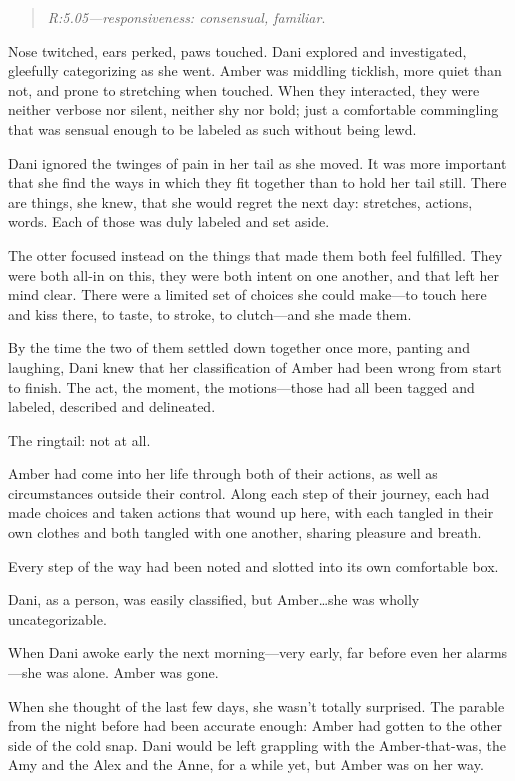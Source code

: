 \begin{quote}
\emph{R:5.05---responsiveness: consensual, familiar}.
\end{quote}

Nose twitched, ears perked, paws touched. Dani explored and investigated, gleefully categorizing as she went. Amber was middling ticklish, more quiet than not, and prone to stretching when touched. When they interacted, they were neither verbose nor silent, neither shy nor bold; just a comfortable commingling that was sensual enough to be labeled as such without being lewd.

Dani ignored the twinges of pain in her tail as she moved. It was more important that she find the ways in which they fit together than to hold her tail still. There are things, she knew, that she would regret the next day: stretches, actions, words. Each of those was duly labeled and set aside.

The otter focused instead on the things that made them both feel fulfilled. They were both all-in on this, they were both intent on one another, and that left her mind clear. There were a limited set of choices she could make---to touch here and kiss there, to taste, to stroke, to clutch---and she made them.

By the time the two of them settled down together once more, panting and laughing, Dani knew that her classification of Amber had been wrong from start to finish. The act, the moment, the motions---those had all been tagged and labeled, described and delineated.

The ringtail: not at all.

Amber had come into her life through both of their actions, as well as circumstances outside their control. Along each step of their journey, each had made choices and taken actions that wound up here, with each tangled in their own clothes and both tangled with one another, sharing pleasure and breath.

Every step of the way had been noted and slotted into its own comfortable box.

Dani, as a person, was easily classified, but Amber\ldots{}she was wholly uncategorizable.

\secdiv{}

\noindent When Dani awoke early the next morning---very early, far before even her alarms---she was alone. Amber was gone.

When she thought of the last few days, she wasn't totally surprised. The parable from the night before had been accurate enough: Amber had gotten to the other side of the cold snap. Dani would be left grappling with the Amber-that-was, the Amy and the Alex and the Anne, for a while yet, but Amber was on her way.

